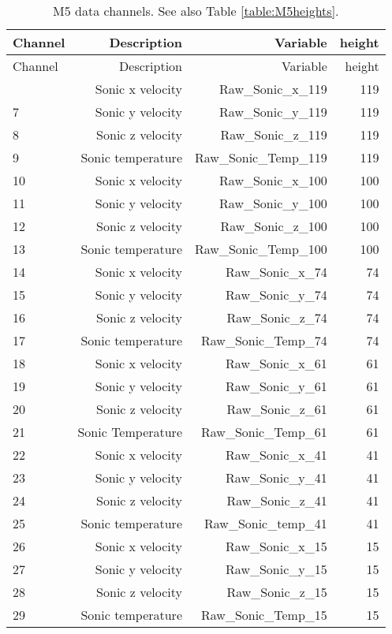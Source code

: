 \begin{longtable}{lrrr}
\caption[M5 channels]{M5 data channels. See also Table \ref{table:M5heights}.\label{table:M5channels}}\\
\toprule
Channel & Description & Variable & height\\
\midrule
\endfirsthead
\toprule
Channel & Description & Variable & height\\
\midrule
\endhead
\bottomrule
\endfoot
\bottomrule
\endlastfoot
6 & Sonic x velocity & Raw\_Sonic\_x\_119 & 119\\
7 & Sonic y velocity & Raw\_Sonic\_y\_119 & 119\\
8 & Sonic z velocity & Raw\_Sonic\_z\_119 & 119\\
9 & Sonic temperature & Raw\_Sonic\_Temp\_119 & 119\\
10 & Sonic x velocity & Raw\_Sonic\_x\_100 & 100\\
11 & Sonic y velocity & Raw\_Sonic\_y\_100 & 100\\
12 & Sonic z velocity & Raw\_Sonic\_z\_100 & 100\\
13 & Sonic temperature & Raw\_Sonic\_Temp\_100 & 100\\
14 & Sonic x velocity & Raw\_Sonic\_x\_74 & 74\\
15 & Sonic y velocity & Raw\_Sonic\_y\_74 & 74\\
16 & Sonic z velocity & Raw\_Sonic\_z\_74 & 74\\
17 & Sonic temperature & Raw\_Sonic\_Temp\_74 & 74\\
18 & Sonic x velocity & Raw\_Sonic\_x\_61 & 61\\
19 & Sonic y velocity & Raw\_Sonic\_y\_61 & 61\\
20 & Sonic z velocity & Raw\_Sonic\_z\_61 & 61\\
21 & Sonic Temperature & Raw\_Sonic\_Temp\_61 & 61\\
22 & Sonic x velocity & Raw\_Sonic\_x\_41 & 41\\
23 & Sonic y velocity & Raw\_Sonic\_y\_41 & 41\\
24 & Sonic z velocity & Raw\_Sonic\_z\_41 & 41\\
25 & Sonic temperature & Raw\_Sonic\_temp\_41 & 41\\
26 & Sonic x velocity & Raw\_Sonic\_x\_15 & 15\\
27 & Sonic y velocity & Raw\_Sonic\_y\_15 & 15\\
28 & Sonic z velocity & Raw\_Sonic\_z\_15 & 15\\
29 & Sonic temperature & Raw\_Sonic\_Temp\_15 & 15\\

\end{longtable}
